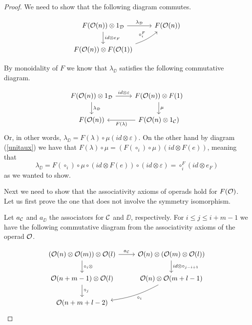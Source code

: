 \documentclass[Thesis.tex]{subfiles}
\begin{document}
\begin{proof}
We need to show that the following diagram commutes.

  \[
 \begin{tikzcd}
F( \OO(n))\otimes 1_\DD\arrow[r, "\lambda_\DD"]\arrow[d, "id\otimes e_F"] &  F(\OO(n)) \\
 F(\OO(n))\otimes F(\OO(1))\arrow[ur, bend right = 10, "\circ_i^F"]&
 \end{tikzcd}
 \]
 
% 
 By monoidality of $F$ we know that $\lambda_\DD$ satisfies the following commutative diagram.
 
 \[
 \begin{tikzcd}
 F(\OO(n))\otimes 1_\DD\arrow[d, "\lambda_\DD"]\arrow[r, "id\otimes \varepsilon"] & F(\OO(n))\otimes F(1)\arrow[d,"\mu"]\\
 F(\OO(n)) & F(\OO(n)\otimes 1_\CC)\arrow[l, "F(\lambda)"]
 \end{tikzcd}
 \]
 Or, in other words, $\lambda_\DD = F(\lambda)\circ \mu(id\otimes \varepsilon)$.  On the other hand by diagram (\ref{unitaux}) we have that $F(\lambda)\circ \mu = (F(\circ_i)\circ \mu)(id\otimes F(e))$, meaning that
 \[\lambda_\DD =  F(\circ_i)\circ \mu\circ (id\otimes F(e))\circ (id\otimes \varepsilon) = \circ_i^F(id\otimes  e_F)\]
 as we wanted to show.
 
 Next we need to show that the associativity axioms of operads hold for $F({\mathcal O})$. Let us first prove the one that does not involve the symmetry isomorphism. 
 
 Let $a_{\mathcal C}$ and $a_\DD$ the associators for ${\mathcal C}$ and $\DD$, respectively. For $i\leq j\leq i+m-1$ we have the following commutative diagram from the associativity axioms of the operad ${\mathcal O}$.
 
 \[
\begin{tikzcd}
(\OO(n)\otimes \OO(m))\otimes \OO(l) \arrow[r, "a_\CC"]\arrow[d, "\circ_i\otimes"] & \OO(n)\otimes (\OO(m)\otimes\OO(l))\arrow[d, "id\otimes\circ_{j-i+1}"]\\
\OO(n+m-1)\otimes\OO(l)\arrow[d, "\circ_j"] & \OO(n)\otimes\OO(m+l-1)\arrow[dl, bend left = 10, "\circ_i"]\\
\OO(n+m+l-2) & 
\end{tikzcd} 
 \]
 

\end{proof}
\end{document}
